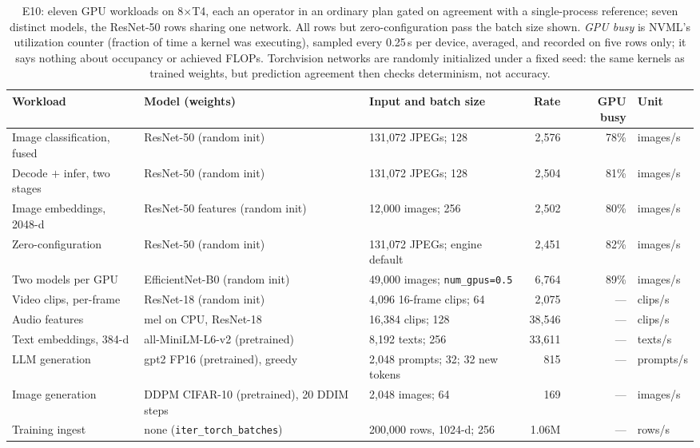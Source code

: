 \documentclass[10pt,twocolumn,letterpaper]{article}   %
\newcommand{\E}[1]{\textsf{E#1}}
\begin{document}
\begin{table}[tbp]
\centering\footnotesize
\setlength{\tabcolsep}{3.6pt}
\begin{tabular}{@{}lllrrl@{}}
\toprule
Workload & Model (weights) & Input and batch size & Rate & GPU busy & Unit \\
\midrule
Image classification, fused & ResNet-50 (random init) & 131{,}072 JPEGs; 128 & 2{,}576 & 78\% & images/s \\
Decode $+$ infer, two stages & ResNet-50 (random init) & 131{,}072 JPEGs; 128 & 2{,}504 & 81\% & images/s \\
Image embeddings, 2048-d & ResNet-50 features (random init) & 12{,}000 images; 256 & 2{,}502 & 80\% & images/s \\
Zero-configuration & ResNet-50 (random init) & 131{,}072 JPEGs; engine default & 2{,}451 & 82\% & images/s \\
Two models per GPU & EfficientNet-B0 (random init) & 49{,}000 images; \texttt{num\_gpus=0.5} & 6{,}764 & 89\% & images/s \\
Video clips, per-frame & ResNet-18 (random init) & 4{,}096 16-frame clips; 64 & 2{,}075 & --- & clips/s \\
Audio features & mel on CPU, ResNet-18 & 16{,}384 clips; 128 & 38{,}546 & --- & clips/s \\
Text embeddings, 384-d & all-MiniLM-L6-v2 (pretrained) & 8{,}192 texts; 256 & 33{,}611 & --- & texts/s \\
LLM generation & gpt2 FP16 (pretrained), greedy & 2{,}048 prompts; 32; 32 new tokens & 815 & --- & prompts/s \\
Image generation & DDPM CIFAR-10 (pretrained), 20 DDIM steps & 2{,}048 images; 64 & 169 & --- & images/s \\
Training ingest & none (\texttt{iter\_torch\_batches}) & 200{,}000 rows, 1024-d; 256 & 1.06M & --- & rows/s \\
\bottomrule
\end{tabular}
\caption{\E{10}: eleven GPU workloads on 8$\times$T4, each an operator in an ordinary plan gated
on agreement with a single-process reference; seven distinct models, the ResNet-50 rows sharing
one network. All rows but zero-configuration pass the batch size shown. \emph{GPU busy} is NVML's
utilization counter (fraction of time a kernel was executing), sampled every 0.25\,s per device,
averaged, and recorded on five rows only; it says nothing about occupancy or achieved FLOPs.
Torchvision networks are randomly initialized under a fixed seed: the same kernels as trained
weights, but prediction agreement then checks determinism, not accuracy.}
\label{tab:gpu}
\end{table}
\end{document}
